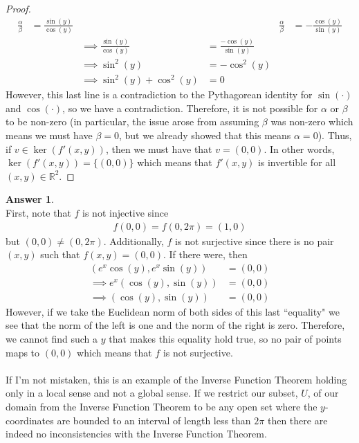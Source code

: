 \documentclass[10pt,a4paper]{article}
\theoremstyle{definition}
\newtheorem*{answer*}{Answer}
\theoremstyle{definition}
\numberwithin{equation}{section}
\begin{document}
\begin{proof}
\begin{align*}
\frac{\alpha}{\beta} &= \frac{\sin(y)}{\cos(y)} &&& \frac{\alpha}{\beta} &= -\frac{\cos(y)}{\sin(y)}\\
& & \implies \frac{\sin(y)}{\cos(y)} &= \frac{-\cos(y)}{\sin(y)}\\
& & \implies \sin^2(y) &= -\cos^2(y)\\
& & \implies \sin^2(y) + \cos^2(y) &= 0
\end{align*}
However, this last line is a contradiction to the Pythagorean identity for $\sin(\cdot)$ and $\cos(\cdot)$, so we have a contradiction. Therefore, it is not possible for $\alpha$ or $\beta$ to be non-zero (in particular, the issue arose from assuming $\beta$ was non-zero which means we must have $\beta = 0$, but we already showed that this means $\alpha = 0$). Thus, if $v \in \ker(f'(x, y))$, then we must have that $v = (0, 0)$. In other words, $\ker(f'(x, y)) = \{(0,0)\}$ which means that $f'(x, y)$ is invertible for all $(x, y) \in \mathbb{R}^2$. 
\end{proof}

\begin{answer*}$ $
\\First, note that $f$ is not injective since 
\begin{align*}
f(0, 0) = f(0, 2\pi) = (1, 0)
\end{align*}
but $(0, 0) \neq (0, 2\pi)$. Additionally, $f$ is not surjective since there is no pair $(x, y)$ such that $f(x, y) = (0, 0)$. If there were, then 
\begin{align*}
(e^x \cos(y), e^x \sin(y)) &= (0, 0)\\
\implies e^x (\cos(y), \sin(y)) &= (0, 0)\\
\implies (\cos(y), \sin(y)) &= (0, 0)
\end{align*}
However, if we take the Euclidean norm of both sides of this last ``equality" we see that the norm of the left is one and the norm of the right is zero. Therefore, we cannot find such a $y$ that makes this equality hold true, so no pair of points maps to $(0, 0)$ which means that $f$ is not surjective. 
\\
\\If I'm not mistaken, this is an example of the Inverse Function Theorem holding only in a local sense and not a global sense. If we restrict our subset, $U$, of our domain from the Inverse Function Theorem to be any open set where the $y$-coordinates are bounded to an interval of length less than $2\pi$ then there are indeed no inconsistencies with the Inverse Function Theorem. 
\end{answer*}
\end{document}
